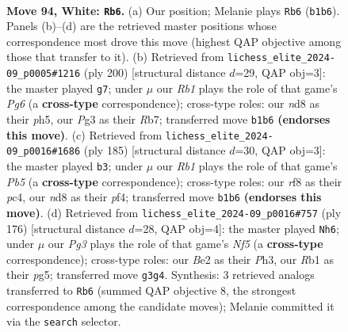 \documentclass[11pt]{article}
\begin{document}
\clearpage

\begin{figure}[p]\centering
\begin{subfigure}{0.46\textwidth}\centering
\resizebox{\linewidth}{!}{%
\newchessgame
\chessboard[
  setfen={3n1r2/3k4/P7/8/8/4K1PP/2P1B3/1R6 w - - 21 94},
  showmover=false,
  pgfstyle=straightmove, color=movearrow, markmove={b1-b6}
]}
\caption{}
\end{subfigure}\hfill
\begin{subfigure}{0.46\textwidth}\centering
\resizebox{\linewidth}{!}{%
\newchessgame
\chessboard[
  setfen={3k4/1R6/6P1/4K2p/4B2P/8/8/2r5 w - - 5 101},
  showmover=false,
  pgfstyle=straightmove, color=movearrow, markmove={g6-g7}
]}
\caption{}
\end{subfigure}
\\[4pt]
\begin{subfigure}{0.46\textwidth}\centering
\resizebox{\linewidth}{!}{%
\newchessgame
\chessboard[
  setfen={8/7p/5k2/2p2b2/1pP2P2/4K3/r7/8 b - - 5 93},
  showmover=false,
  pgfstyle=straightmove, color=movearrow, markmove={b4-b3}
]}
\caption{}
\end{subfigure}\hfill
\begin{subfigure}{0.46\textwidth}\centering
\resizebox{\linewidth}{!}{%
\newchessgame
\chessboard[
  setfen={5R2/8/8/5Np1/8/3k3P/r2n2PK/8 w - - 76 89},
  showmover=false,
  pgfstyle=straightmove, color=movearrow, markmove={f5-h6}
]}
\caption{}
\end{subfigure}
\caption{\textbf{Move 94, White: \texttt{Rb6}.} (a) Our position; Melanie plays \texttt{Rb6} (\texttt{b1b6}). Panels (b)--(d) are the retrieved master positions whose correspondence most drove this move (highest QAP objective among those that transfer to it). (b) Retrieved from \texttt{lichess\_elite\_2024-09\_p0005\#1216} (ply 200) [structural distance $d$=29, QAP obj=3]: the master played \texttt{g7}; under $\mu$ our \emph{Rb1} plays the role of that game's \emph{Pg6} (a \textbf{cross-type} correspondence); cross-type roles: our \emph{n}d8 as their \emph{p}h5, our \emph{P}g3 as their \emph{R}b7; transferred move \texttt{b1b6} \textbf{(endorses this move)}. (c) Retrieved from \texttt{lichess\_elite\_2024-09\_p0016\#1686} (ply 185) [structural distance $d$=30, QAP obj=3]: the master played \texttt{b3}; under $\mu$ our \emph{Rb1} plays the role of that game's \emph{Pb5} (a \textbf{cross-type} correspondence); cross-type roles: our \emph{r}f8 as their \emph{p}c4, our \emph{n}d8 as their \emph{p}f4; transferred move \texttt{b1b6} \textbf{(endorses this move)}. (d) Retrieved from \texttt{lichess\_elite\_2024-09\_p0016\#757} (ply 176) [structural distance $d$=28, QAP obj=4]: the master played \texttt{Nh6}; under $\mu$ our \emph{Pg3} plays the role of that game's \emph{Nf5} (a \textbf{cross-type} correspondence); cross-type roles: our \emph{B}e2 as their \emph{P}h3, our \emph{R}b1 as their \emph{p}g5; transferred move \texttt{g3g4}. Synthesis: 3 retrieved analogs transferred to \texttt{Rb6} (summed QAP objective 8, the strongest correspondence among the candidate moves); Melanie committed it via the \texttt{search} selector.}
\label{fig:thought-m186}
\end{figure}
\end{document}
